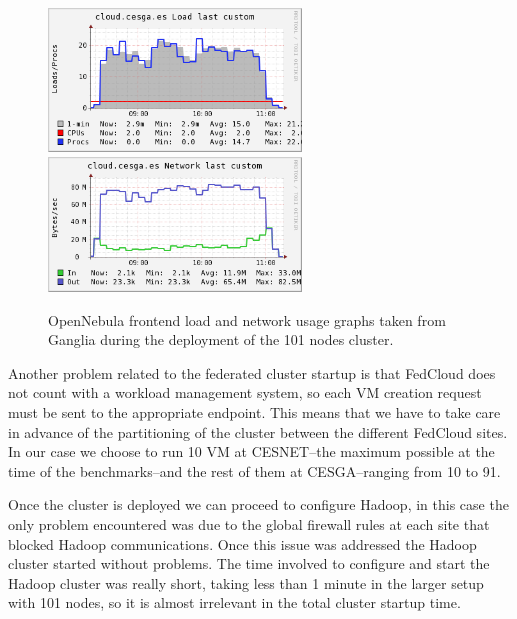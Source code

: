 \documentclass[oribibl]{llncs_Ibergrid2013}
\begin{document}
\begin{figure}[t!]
\centering
\includegraphics[width=0.6\textwidth]{figures/ON_load-complete.png}
\includegraphics[width=0.6\textwidth]{figures/ON_network-complete.png}
\caption{OpenNebula frontend load and network usage graphs taken from Ganglia during the deployment of the 101 nodes cluster.}
\label{fig:on}
\end{figure}


Another problem related to the federated cluster startup is that FedCloud does not count with a workload management system, so each VM creation request must be sent to the appropriate endpoint. This means that we have to take care in advance of the partitioning of the cluster between the different FedCloud sites. In our case we choose to run 10 VM at CESNET--the maximum possible at the time of the benchmarks--and the rest of them at CESGA--ranging from 10 to 91.

Once the cluster is deployed we can proceed to configure Hadoop, in this case the only problem encountered was due to the global firewall rules at each site that blocked Hadoop communications. Once this issue was addressed the Hadoop cluster started without problems. The time involved to configure and start the Hadoop cluster was really short, taking less than 1 minute in the larger setup with 101 nodes, so it is almost irrelevant in the total cluster startup time.

\end{document}

